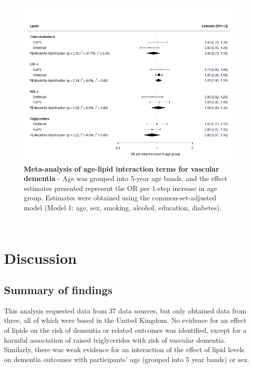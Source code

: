 \documentclass[a4paper, twoside]{templates/ociamthesis}
\begin{document}
\begin{figure}[H]
\includegraphics[width=1\linewidth]{figures/ipd/interaction_age_vasdem} \caption[Meta-analysis of age-lipid interaction terms for vascular dementia]{\textbf{Meta-analysis of age-lipid interaction terms for vascular dementia} - Age was grouped into 5-year age bands, and the effect estimates presented represent the OR per 1-step increase in age group. Estimates were obtained using the common-set-adjusted model (Model 1: age, sex, smoking, alcohol, education, diabetes).}\label{fig:interactionVascularAge}
\end{figure}

~

\hypertarget{discussion-3}{%
\section{Discussion}\label{discussion-3}}

\hypertarget{summary-of-findings-2}{%
\subsection{Summary of findings}\label{summary-of-findings-2}}

This analysis requested data from 37 data sources, but only obtained data from three, all of which were based in the United Kingdom. No evidence for an effect of lipids on the risk of dementia or related outcomes was identified, except for a harmful association of raised triglycerides with risk of vascular dementia. Similarly, there was weak evidence for an interaction of the effect of lipid levels on dementia outcomes with participants' age (grouped into 5 year bands) or sex.
\end{document}
